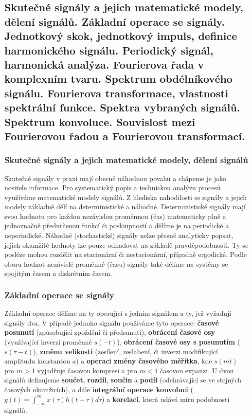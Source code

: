 \subsection{Skutečné signály a jejich matematické modely, dělení signálů. Základní operace se signály. Jednotkový skok, jednotkový impuls, definice harmonického signálu. Periodický signál, harmonická analýza. Fourierova řada v komplexním tvaru. Spektrum obdélníkového signálu. Fourierova transformace, vlastnosti spektrální funkce. Spektra vybraných signálů. Spektrum konvoluce. Souvislost mezi Fourierovou řadou a Fourierovou transformací. }
	\subsubsection{Skutečné signály a jejich matematické modely, dělení signálů} 
		Skutečné signály v praxi mají obecně náhodnou povahu a chápeme je jako nositele informace. Pro systematický popis a technickou analýzu procesů využíváme matematické modely signálů. Z hlediska nahodilosti se signály a jejich modely základně dělí na deterministické a náhodné. Deterministické signály mají svou hodnotu pro každou nezávislou proměnnou (čas) matematicky plně a jednoznačně předurčenou funkcí či posloupností a dělíme je na periodické a neperiodické. Náhodné (stochastické) signály nelze přesně analyticky popsat, jejich okamžité hodnoty lze pouze odhadovat na základě pravděpodobnosti. Ty se posléze mohou rozdělit na stacionární či nestacionární, případně ergodické. Podle oboru hodnot nezávislé proměnné (času) signály také dělíme na systémy se spojitým časem a diskrétním časem.
	\subsubsection{Základní operace se signály}
		Základní operace dělíme na ty operující s jedním signálem a ty, jež vyžadují signály dva. V případě jednoho signálu používáme tyto operace: \textbf{časové posunutí} (způsobující zpoždění či předsunutí), \textbf{obrácení časové osy} (využívající inverzi proměnné $s(-t)$), \textbf{obrácení časové osy s posunutím} ($s(\tau - t)$), \textbf{změnu velikosti} (zesílení, zeslabení, či inverzi modifikující amplitudu konstantou $a$) a \textbf{operaci změny časového měřítka}, kde $s(mt)$ pro $m > 1$ vyjadřuje časovou kompresi a pro $m < 1$ časovou expanzi. U dvou signálů definujeme \textbf{součet}, \textbf{rozdíl}, \textbf{součin} a \textbf{podíl} (odehrávající se ve stejných časových okamžicích), a dále \textbf{integrální operace konvoluci} ($y(t) = \int_{-\infty}^{\infty} x(\tau)h(t - \tau)d\tau$) a \textbf{korelaci}, která udává míru podobnosti signálů.
